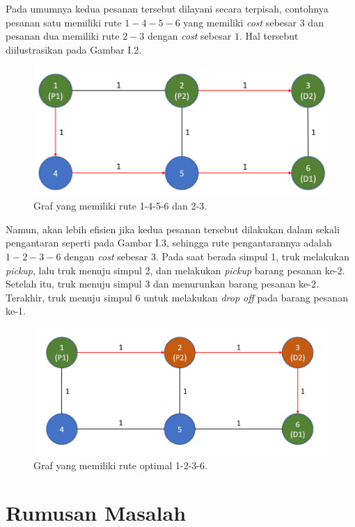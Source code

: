 Pada umumnya kedua pesanan tersebut dilayani secara terpisah, contohnya pesanan satu 
memiliki rute $1-4-5-6$ yang memiliki \textit{cost} sebesar $3$ dan pesanan dua memiliki 
rute $2-3$ dengan \textit{cost} sebesar $1$. Hal tersebut diilustrasikan pada Gambar I.2.

\begin{figure}[H]
  \centering
  \includegraphics[width=1.0\textwidth]{resources/graph_routes.png}
  \caption{Graf yang memiliki rute 1-4-5-6 dan 2-3.}
\end{figure}

Namun, akan lebih efisien jika kedua pesanan tersebut dilakukan dalam sekali pengantaran 
seperti pada Gambar I.3, sehingga rute pengantarannya adalah $1-2-3-6$ dengan \textit{cost} 
sebesar $3$. Pada saat berada simpul 1, truk melakukan \textit{pickup}, lalu truk menuju 
simpul 2, dan melakukan \textit{pickup} barang pesanan ke-2. Setelah itu, truk menuju simpul 3 
dan menurunkan barang pesanan ke-2. Terakhir, truk menuju simpul 6  untuk melakukan 
\textit{drop off} pada barang pesanan ke-1.

\begin{figure}[H]
  \centering
  \includegraphics[width=1.0\textwidth]{resources/graph_optimal.png}
  \caption{Graf yang memiliki rute optimal 1-2-3-6.}
\end{figure}

\section{Rumusan Masalah}

